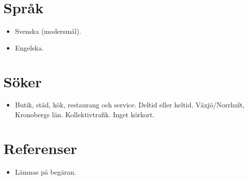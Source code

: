 \documentclass[11pt,a4paper,sans]{moderncv}
\begin{document}

\section{Språk}
\vspace{1pt}
\begin{itemize}
\item {Svenska (modersmål).}
\item {Engelska.}
\end{itemize}

\section{Söker}
\vspace{1pt}
\begin{itemize}
\item {Butik, städ, kök, restaurang och service. Deltid eller heltid. Växjö/Norrhult, Kronobergs län. Kollektivtrafik. Inget körkort.}
\end{itemize}


\enlargethispage{3\baselineskip}
\section{Referenser}
\vspace{1pt}
\begin{itemize}
\item{Lämnas på begäran.}
\end{itemize}
\end{document}

